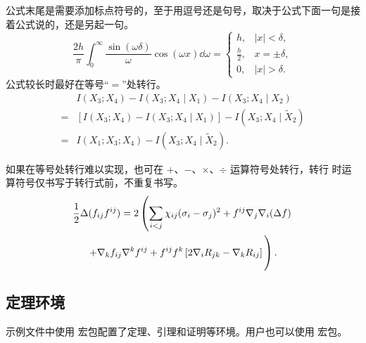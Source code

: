 \documentclass{sjtureport}
\begin{document}
公式末尾是需要添加标点符号的，至于用逗号还是句号，取决于公式下面一句是接着公式说的，还是另起一句。
\begin{equation}
	\frac{2h}{\pi}\int_{0}^{\infty}\frac{\sin\left( \omega\delta \right)}{\omega}
	\cos\left( \omega x \right) \dd\omega = 
	\begin{cases}
	h, & \left| x \right| < \delta, \\
	\frac{h}{2}, & x = \pm \delta, \\
	0, & \left| x \right| > \delta.
	\end{cases}
\end{equation}
公式较长时最好在等号“$=$”处转行。
\begin{align}
	& I (X_3; X_4) - I (X_3; X_4 \mid X_1) - I (X_3; X_4 \mid X_2) \nonumber \\
	= & [I (X_3; X_4) - I (X_3; X_4 \mid X_1)] - I (X_3; X_4 \mid \tilde{X}_2) \\
	= & I (X_1; X_3; X_4) - I (X_3; X_4 \mid \tilde{X}_2).
\end{align}

如果在等号处转行难以实现，也可在 $+$、$-$、$\times$、$\div$ 运算符号处转行，转行
时运算符号仅书写于转行式前，不重复书写。
\begin{multline}
	\frac{1}{2} \Delta (f_{ij} f^{ij}) =
	2 \left(\sum_{i<j} \chi_{ij}(\sigma_{i} - \sigma_{j})^{2}
	+ f^{ij} \nabla_{j} \nabla_{i} (\Delta f) \right. \\
	\left. + \nabla_{k} f_{ij} \nabla^{k} f^{ij} +
	f^{ij} f^{k} \left[2\nabla_{i}R_{jk}
	- \nabla_{k} R_{ij} \right] \vphantom{\sum_{i<j}} \right).
\end{multline}

\subsection{定理环境}

示例文件中使用  宏包配置了定理、引理和证明等环境。用户也可以使用
 宏包。
\end{document}
